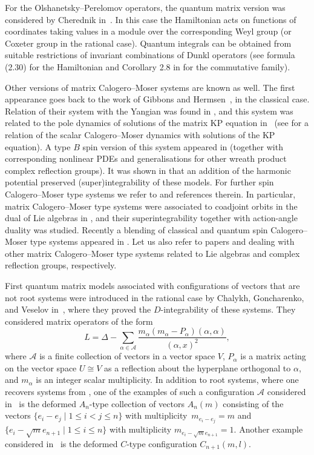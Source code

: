 \documentclass[12pt]{amsart}
\numberwithin{equation}{section}
\theoremstyle{definition}
\begin{document}
For the Olshanetsky--Perelomov operators, the quantum matrix version 
was considered by Cherednik in~\cite{Ch2}. In this case the Hamiltonian acts on functions of coordinates taking values in a module over the corresponding Weyl group (or Coxeter group in the rational case). Quantum integrals can be obtained from suitable restrictions of invariant combinations of Dunkl operators (see formula (2.30) for the Hamiltonian and Corollary 2.8 in \cite{Ch2} for the commutative family). 


Other versions of matrix Calogero--Moser systems are known as well. The first appearance goes back to the work of Gibbons and Hermsen~\cite{GH}, in the classical case. Relation of their system with the Yangian was found in \cite{BAB1}, and this system was related to the pole dynamics of solutions of the matrix KP equation in~\cite{KBBT} (see \cite{Krich} for a relation of the scalar Calogero--Moser dynamics with  solutions of the KP equation). A type $B$ spin version of this system appeared in \cite{ChS} (together with corresponding nonlinear PDEs and generalisations for other wreath product complex reflection groups). It was shown in \cite{FH} that an addition of the harmonic potential preserved (super)integrability of these models.
For further spin Calogero--Moser type systems we refer to \cite{LX} and references therein. In particular, matrix Calogero--Moser type systems were associated to coadjoint orbits in the dual of Lie algebras in \cite{Resh}, and their superintegrability together with action-angle duality was studied. Recently a blending of classical and quantum spin Calogero--Moser type systems appeared in \cite{LRS}. Let us also refer to papers \cite{Crampe} and \cite{CrampeYoung} dealing with other matrix Calogero--Moser type systems related to Lie algebras and complex reflection groups, respectively.

First quantum matrix models associated with configurations of vectors that are not root systems were introduced in the rational case by Chalykh, Goncharenko, and Veselov in~\cite{CGV}, where they proved the $D$-integrability of these systems. They considered matrix operators of the form
\begin{equation*}
    L = \Delta - \sum\limits_{\alpha \in \mathcal{A}}\frac{m_{\alpha}(m_{\alpha} - P_{\alpha}) (\alpha, \alpha)}{(\alpha, x)^2},
\end{equation*} 
where $\mathcal{A}$ is a finite collection of vectors in a vector space $V$, $P_{\alpha}$ is a matrix acting on the vector space $U \cong V$ as a reflection about the hyperplane orthogonal to $\alpha$, and $m_\alpha$ is an integer scalar multiplicity.
In addition to root systems, where one recovers systems from \cite{Ch2}, one of the examples of such a configuration $\mathcal A$ considered in~\cite{CGV} is the deformed $A_n$-type collection of vectors $A_{n}(m)$ consisting of the vectors $\{e_i - e_j \mid 1 \leq i < j \leq n \}$ with multiplicity~$m_{e_i -e_j} = m$ and $\{e_i - \sqrt{m} e_{n + 1} \mid 1 \leq i \leq n \}$ with multiplicity $m_{e_i - \sqrt{m} e_{n + 1}} = 1$. %
Another example considered in~\cite{CGV} is the deformed $C$-type configuration $C_{n+1}(m,l)$.
\end{document}
